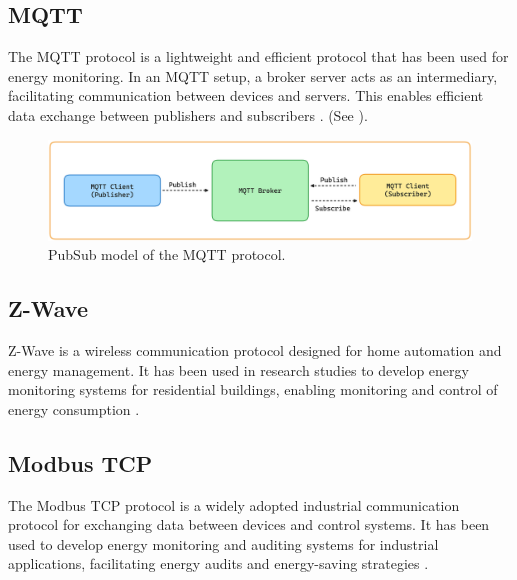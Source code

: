 \documentclass[
  table]{report}
\begin{document}
\subsection{MQTT}

The \ac{MQTT} protocol is a lightweight and efficient protocol that has
been used for energy monitoring. In an MQTT setup, a broker server acts
as an intermediary, facilitating communication between devices and
servers. This enables efficient data exchange between publishers and
subscribers \citep{al-fuqahaInternetThingsSurvey2015}. (See
).

\begin{figure}[H]
\centering
  \includegraphics{assets/3-mqtt-pubsub.png}
  \caption{PubSub model of the MQTT protocol.}
  \label{fig:mqtt-model.png}
\end{figure}

\subsection{Z-Wave}

Z-Wave is a wireless communication protocol designed for home automation
and energy management. It has been used in research studies to develop
energy monitoring systems for residential buildings, enabling monitoring
and control of energy consumption
\citep{al-fuqahaInternetThingsSurvey2015}.


\subsection{Modbus TCP}

The Modbus TCP protocol is a widely adopted industrial communication
protocol for exchanging data between devices and control systems. It has
been used to develop energy monitoring and auditing systems for
industrial applications, facilitating energy audits and energy-saving
strategies \citep{tongStudyEthernetCommunication2015}.
\end{document}
